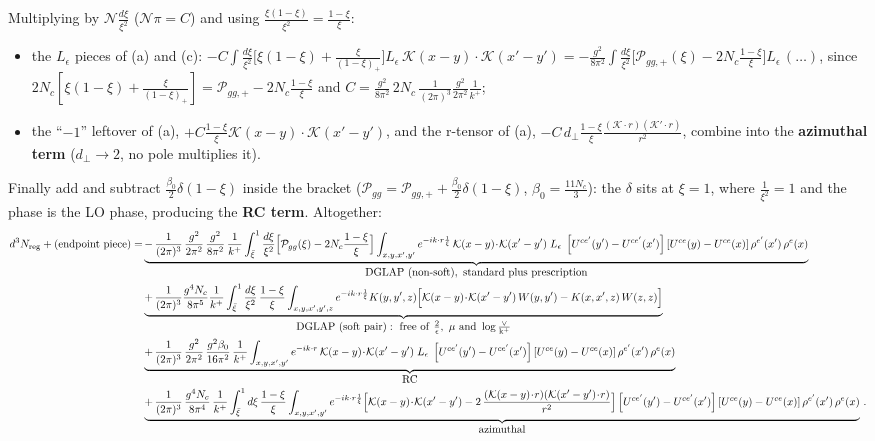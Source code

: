 \documentclass[9pt]{article}
\newcommand{\Leps}{L_{\epsilon}}
\newcommand{\KK}{\mathcal K(x-y)\!\cdot\!\mathcal K(x'-y')}
\newcommand{\Wyy}{\left[U^{ce'}(y') - U^{ce'}(x')\right] \left[U^{ce}(y) - U^{ce}(x)\right] \rho^{e'}(x')\, \rho^{e}(x)}
\begin{document}
Multiplying by $\mathcal N\frac{d\xi}{\xi^{2}}$ ($\mathcal N\pi=C$) and using
$\frac{\xi(1-\xi)}{\xi^{2}}=\frac{1-\xi}{\xi}$:
\begin{itemize}
\item the $\Leps$ pieces of (a) and (c):
$-C\int\frac{d\xi}{\xi^{2}}\big[\xi(1-\xi)+\frac{\xi}{(1-\xi)_{+}}\big]\Leps\,\KK
=-\frac{g^{2}}{8\pi^{2}}\int\frac{d\xi}{\xi^{2}}\big[\mathcal P_{gg,+}(\xi)-2N_{c}\tfrac{1-\xi}{\xi}\big]\Leps\,(\dots)$,
since $2N_{c}[\xi(1-\xi)+\frac{\xi}{(1-\xi)_{+}}]=\mathcal P_{gg,+}-2N_{c}\frac{1-\xi}{\xi}$
and $C=\frac{g^{2}}{8\pi^{2}}\,2N_{c}\,\frac{1}{(2\pi)^{3}}\frac{g^{2}}{2\pi^{2}}\frac{1}{k^{+}}$;
\item the ``$-1$'' leftover of (a), $+C\frac{1-\xi}{\xi}\KK$, and the r-tensor of (a),
$-C\,d_{\perp}\frac{1-\xi}{\xi}\frac{(\mathcal K\cdot r)(\mathcal K'\cdot r)}{r^{2}}$,
combine into the \textbf{azimuthal term} ($d_{\perp}\to2$, no pole multiplies it).
\end{itemize}
Finally add and subtract $\frac{\beta_{0}}{2}\delta(1-\xi)$ inside the bracket
($\mathcal P_{gg}=\mathcal P_{gg,+}+\frac{\beta_{0}}{2}\delta(1-\xi)$,
$\beta_{0}=\frac{11N_{c}}{3}$): the $\delta$ sits at $\xi=1$, where $\frac{1}{\xi^{2}}=1$ and
the phase is the LO phase, producing the \textbf{RC term}. Altogether:
\begin{align}\label{eq:reg}
d^{3}N_{\rm reg}+(\text{endpoint piece})
=&\underbrace{-\,\frac{1}{(2\pi)^{3}}\,\frac{g^{2}}{2\pi^{2}}\,\frac{g^{2}}{8\pi^{2}}\,\frac{1}{k^{+}}
\int_{\bar\xi}^{1}\frac{d\xi}{\xi^{2}}\Big[\mathcal P_{gg}(\xi)-2N_{c}\frac{1-\xi}{\xi}\Big]
\int_{x,y,x',y'}e^{-ik\cdot r\frac{1}{\xi}}\,\KK\;\Leps\;\Wyy}_{\textstyle\rm DGLAP\ (non\text{-}soft),\ standard\ plus\ prescription}\notag\\
&\underbrace{+\,\frac{1}{(2\pi)^{3}}\frac{g^{4}N_{c}}{8\pi^{5}}\frac{1}{k^{+}}
\int_{\bar\xi}^{1}\frac{d\xi}{\xi^{2}}\,\frac{1-\xi}{\xi}
\int_{x,y,x',y',z}e^{-ik\cdot r\frac{1}{\xi}}K(y,y',z)
\Big[\KK\,W(y,y')-K(x,x',z)\,W(z,z)\Big]}_{\textstyle\rm DGLAP\ (soft\ pair):\ free\ of\ \frac{2}{\epsilon},\ \mu\ and\ \log\frac{\vee}{k^{+}}}\notag\\
&\underbrace{+\,\frac{1}{(2\pi)^{3}}\,\frac{g^{2}}{2\pi^{2}}\,\frac{g^{2}\beta_{0}}{16\pi^{2}}\,\frac{1}{k^{+}}
\int_{x,y,x',y'}e^{-ik\cdot r}\,\KK\;\Leps\;\Wyy}_{\textstyle\rm RC}\notag\\
&\underbrace{+\,\frac{1}{(2\pi)^{3}}\,\frac{g^{4}N_{c}}{8\pi^{4}}\,\frac{1}{k^{+}}
\int_{\bar\xi}^{1}d\xi\,\frac{1-\xi}{\xi}
\int_{x,y,x',y'}e^{-ik\cdot r\frac{1}{\xi}}
\Big[\KK-2\,\frac{(\mathcal K(x-y)\!\cdot\!r)(\mathcal K(x'-y')\!\cdot\!r)}{r^{2}}\Big]\Wyy}_{\textstyle\rm azimuthal}\,.
\end{align}
\end{document}
